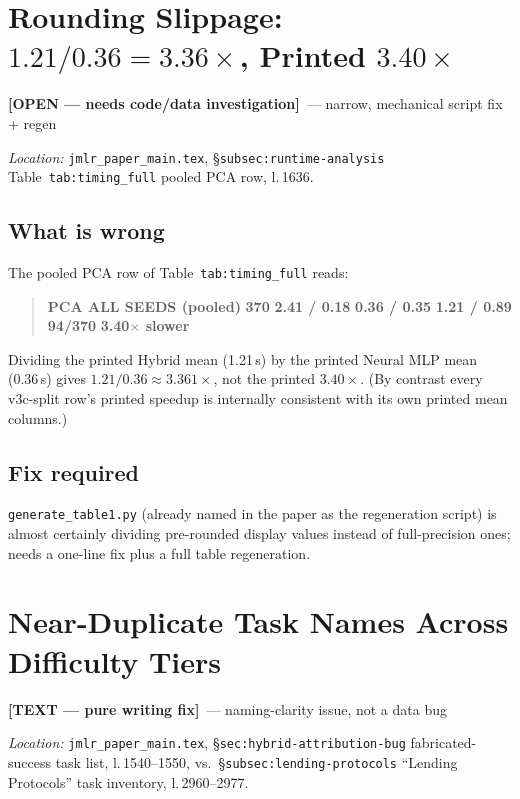 \documentclass[11pt]{article}
\newcommand{\open}{\textcolor{red!60!black}{\textbf{[OPEN --- needs code/data investigation]}}}
\newcommand{\textfix}{\textcolor{green!40!black}{\textbf{[TEXT --- pure writing fix]}}}
\newcommand{\loc}[1]{\textit{Location:} #1\par}
\newenvironment{evidence}
  {\begin{quote}\small\ttfamily}
  {\end{quote}}
\begin{document}
\section{Rounding Slippage: $1.21/0.36 = 3.36\times$, Printed $3.40\times$}
\label{issue:12}
\open\ --- narrow, mechanical script fix + regen

\loc{\texttt{jmlr\_paper\_main.tex}, \S\texttt{subsec:runtime-analysis}
Table~\texttt{tab:timing\_full} pooled PCA row, l.\,1636.}

\subsection*{What is wrong}
The pooled PCA row of Table~\texttt{tab:timing\_full} reads:
\begin{evidence}
\textbf{PCA ALL SEEDS (pooled)} \quad \textbf{370} \quad \textbf{2.41 / 0.18}
\quad \textbf{0.36 / 0.35} \quad \textbf{1.21 / 0.89} \quad \textbf{94/370}
\quad \textbf{3.40$\times$ slower}
\end{evidence}
Dividing the printed Hybrid mean (1.21\,s) by the printed Neural MLP mean
(0.36\,s) gives $1.21/0.36 \approx 3.361\times$, not the printed
$3.40\times$. (By contrast every v3c-split row's printed speedup is
internally consistent with its own printed mean columns.)

\subsection*{Fix required}
\texttt{generate\_table1.py} (already named in the paper as the
regeneration script) is almost certainly dividing pre-rounded display
values instead of full-precision ones; needs a one-line fix plus a full
table regeneration.

\section{Near-Duplicate Task Names Across Difficulty Tiers}
\label{issue:13}
\textfix\ --- naming-clarity issue, not a data bug

\loc{\texttt{jmlr\_paper\_main.tex}, \S\texttt{sec:hybrid-attribution-bug}
fabricated-success task list, l.\,1540--1550, vs.\
\S\texttt{subsec:lending-protocols} ``Lending Protocols'' task inventory,
l.\,2960--2977.}
\end{document}
